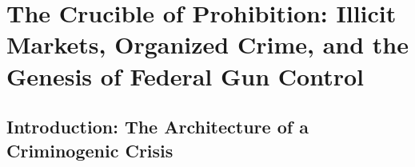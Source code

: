 \documentclass[
]{article}
\author{Emmanuel Theodore}
\date{}
\begin{document}
\section{\texorpdfstring{\textbf{The Crucible of Prohibition: Illicit
Markets, Organized Crime, and the Genesis of Federal Gun
Control}}{The Crucible of Prohibition: Illicit Markets, Organized Crime, and the Genesis of Federal Gun Control}}\label{the-crucible-of-prohibition-illicit-markets-organized-crime-and-the-genesis-of-federal-gun-control}

\subsection{\texorpdfstring{\textbf{Introduction: The Architecture of a
Criminogenic
Crisis}}{Introduction: The Architecture of a Criminogenic Crisis}}\label{introduction-the-architecture-of-a-criminogenic-crisis}
\end{document}
